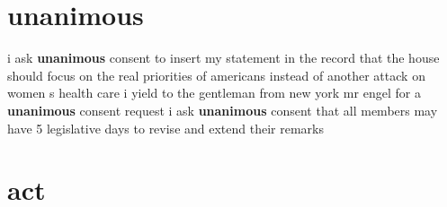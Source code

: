 \documentclass{article}
\begin{document}
\section*{unanimous}
i ask {\bf \color{red} unanimous} consent to insert my statement in the record that the house should focus on the real priorities of americans instead of another attack on women s health care
\vspace{8mm}
i yield to the gentleman from new york mr engel for a {\bf \color{red} unanimous} consent request
\vspace{8mm}
i ask {\bf \color{red} unanimous} consent that all members may have 5 legislative days to revise and extend their remarks\pagebreak

\section*{act}
\end{document}
